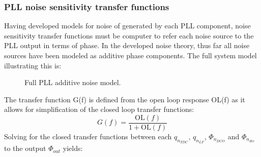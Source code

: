 	\subsubsection{PLL noise sensitivity transfer functions}
		Having developed models for noise of generated by each PLL component, noise sensitivity transfer functions must be computer to refer each noise source to the PLL output in terms of phase. In the developed noise theory, thus far all noise sources have been modeled as additive phase components. The full system model illustrating this is:
		\begin{figure}[htb!]
			\center
			\caption{Full PLL additive noise model.}
			\label{fig:full_pll_noise}
		\end{figure}
		\FloatBarrier
		The transfer function G(f) is defined from the open loop response OL(f) as it allows for simplification of the closed loop transfer functions:
		\begin{equation}
		G(f) = \frac{\mathrm{OL}(f)}{1+\mathrm{OL}(f)}
		\end{equation}
		Solving for the closed transfer functions between each $q_{n_{TDC}}$, $q_{n_{LF}}$, $\Phi_{n_{DCO}}$ and $\Phi_{n_{div}}$ to the output $\Phi_{out}$ yields:


